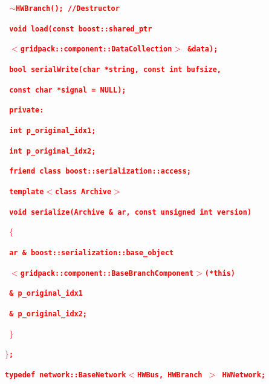 \documentclass[12pt]{report} %
\begin{document}
\textcolor{red}{\texttt{\textbf{    $\boldsymbol{\mathrm{\sim}}$HWBranch();  //Destructor}}}

\textcolor{red}{\texttt{\textbf{    void load(const boost::shared\_ptr}}}

\textcolor{red}{\texttt{\textbf{              $\boldsymbol{\mathrm{<}}$gridpack::component::DataCollection$\boldsymbol{\mathrm{>}}$ \&data);}}}

\textcolor{red}{\texttt{\textbf{    bool serialWrite(char *string, const int bufsize,}}}

\textcolor{red}{\texttt{\textbf{                     const char *signal = NULL);}}}

\textcolor{red}{\texttt{\textbf{}}}

\textcolor{red}{\texttt{\textbf{  private:}}}

\textcolor{red}{\texttt{\textbf{    int p\_original\_idx1;}}}

\textcolor{red}{\texttt{\textbf{    int p\_original\_idx2;}}}

\textcolor{red}{\texttt{\textbf{}}}

\textcolor{red}{\texttt{\textbf{  friend class boost::serialization::access;}}}

\textcolor{red}{\texttt{\textbf{}}}

\textcolor{red}{\texttt{\textbf{  template$\boldsymbol{\mathrm{<}}$class Archive$\boldsymbol{\mathrm{>}}$}}}

\textcolor{red}{\texttt{\textbf{  void serialize(Archive \& ar, const unsigned int version)}}}

\textcolor{red}{\texttt{\textbf{  $\boldsymbol{\mathrm{\{}}$}}}

\textcolor{red}{\texttt{\textbf{    ar \& boost::serialization::base\_object}}}

\textcolor{red}{\texttt{\textbf{       $\boldsymbol{\mathrm{<}}$gridpack::component::BaseBranchComponent$\boldsymbol{\mathrm{>}}$(*this)}}}

\textcolor{red}{\texttt{\textbf{       \& p\_original\_idx1}}}

\textcolor{red}{\texttt{\textbf{       \& p\_original\_idx2;}}}

\textcolor{red}{\texttt{\textbf{  $\boldsymbol{\mathrm{\}}}$}}}

\textcolor{red}{\texttt{\textbf{}}}

\textcolor{red}{\texttt{\textbf{$\boldsymbol{\mathrm{\}}}$;}}}

\textcolor{red}{\texttt{\textbf{typedef network::BaseNetwork$\boldsymbol{\mathrm{<}}$HWBus, HWBranch $\boldsymbol{\mathrm{>}}$ HWNetwork;}}}
\end{document}

